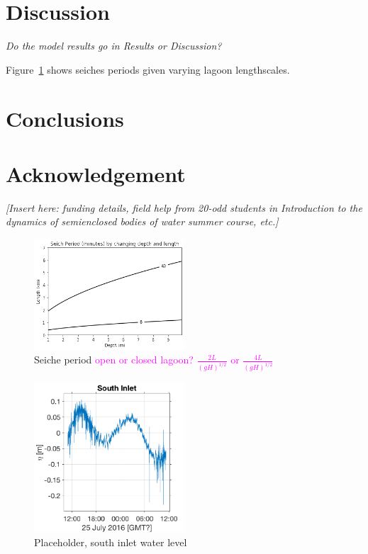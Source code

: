\documentclass[11pt]{article}
\begin{document}
\section{Discussion}

\textit{Do the model results go in Results or Discussion?}

Figure~\ref{figSeiche} shows seiches periods given varying lagoon lengthscales. 




\section{Conclusions}


\section{Acknowledgement}

\textit{[Insert here: funding details, field help from 20-odd students in Introduction to the dynamics of semienclosed bodies of water summer course, etc.]}



{}


\begin{figure}[ht!]
\centerline{\includegraphics[width=0.5\textwidth]{images/nichupteseiche.png}}

\internallinenumbers\caption{Seiche period \textcolor{magenta}{open or closed lagoon? $\frac{2 L}{\left(gH\right)^{1/2}}$ or $\frac{4 L}{\left(gH\right)^{1/2}}$}}
\label{figSeiche}
\end{figure}


\begin{figure}[ht!]
\centerline{\includegraphics[width=0.5\textwidth]{images/waterlevel_southinlet.png}}
\internallinenumbers\caption{Placeholder, south inlet water level}
\label{figWLnizuc}
\end{figure}
\end{document}
